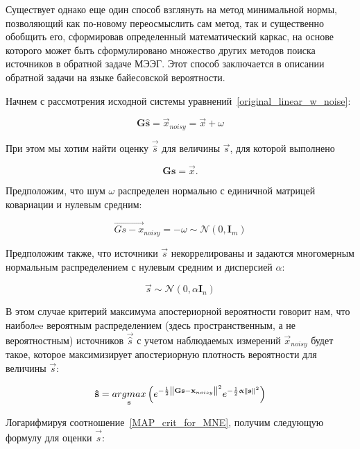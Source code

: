 Существует однако еще один способ взглянуть на метод минимальной нормы,
позволяющий как по-новому переосмыслить сам метод, так и существенно обобщить
его, сформировав определенный математический каркас, на основе которого
может быть сформулировано множество других методов поиска источников
в обратной задаче МЭЭГ. Этот способ заключается в описании обратной задачи
на языке байесовской вероятности.

Начнем с рассмотрения исходной системы уравнений~\ref{original_linear_w_noise}:

\begin{equation}
    \mathbf{G\hat{s}} = \vec{x}_{noisy} = \vec{x} + \omega
\end{equation}

При этом мы хотим найти оценку $\vec{\hat{s}}$ для величины $\vec{s}$,
для которой выполнено

\begin{equation}
    \mathbf{Gs} = \vec{x}.
\end{equation}

Предположим, что шум $\omega$ распределен нормально с единичной
матрицей ковариации и нулевым средним:

\begin{equation}
    \vec{Gs - x}_{noisy} = -\omega \sim \mathcal{N}(0, \mathbf{I}_m)
\end{equation}

Предположим также, что источники $\vec{s}$ некоррелированы и задаются
многомерным нормальным распределением с нулевым средним и дисперсией $\alpha$:

\begin{equation}
    \vec{s} \sim \mathcal{N}(0, \alpha\mathbf{I}_n)
\end{equation}

В этом случае критерий максимума апостериорной вероятности говорит нам, что
наиболee вероятным распределением (здесь пространственным, а не вероятностным)
источников $\vec{\hat{s}}$ с учетом наблюдаемых измерений
$\vec{x}_{noisy}$ будет такое, которое максимизирует апостериорную
плотность вероятности для величины $\vec{s}$:

\begin{equation}
    \mathbf{\hat{s}} =
    \underset{\mathbf{s}}{argmax} \left(
        e^{-\frac{1}{2}\left\lVert\mathbf{Gs - x}_{noisy}\right\rVert^2} e^{-\frac{1}{2}\upalpha\left\lVert\mathbf{s}\right\rVert^2}
    \right)
    \label{MAP_crit_for_MNE}
\end{equation}

Логарифмируя соотношение~\ref{MAP_crit_for_MNE}, получим следующую формулу
для оценки $\vec{\hat{s}}$:

